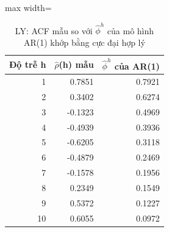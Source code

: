 \begin{table}[H]
\centering\footnotesize
\caption{LY: ACF mẫu so với $\hat\phi^h$ của mô hình AR(1) khớp bằng cực đại hợp lý}\label{tab:tab_b11_06_ly_ar1}
\begin{adjustbox}{max width=\linewidth}
\begin{tabular}{|r|r|r|}
\toprule
Độ trễ h & $\hat{\rho}$(h) mẫu & $\hat{\phi}^{h}$ của AR(1) \\
\midrule
1 & 0.7851 & 0.7921 \\
2 & 0.3402 & 0.6274 \\
3 & -0.1323 & 0.4969 \\
4 & -0.4939 & 0.3936 \\
5 & -0.6205 & 0.3118 \\
6 & -0.4879 & 0.2469 \\
7 & -0.1578 & 0.1956 \\
8 & 0.2349 & 0.1549 \\
9 & 0.5372 & 0.1227 \\
10 & 0.6055 & 0.0972 \\
\bottomrule
\end{tabular}
\end{adjustbox}
\end{table}
